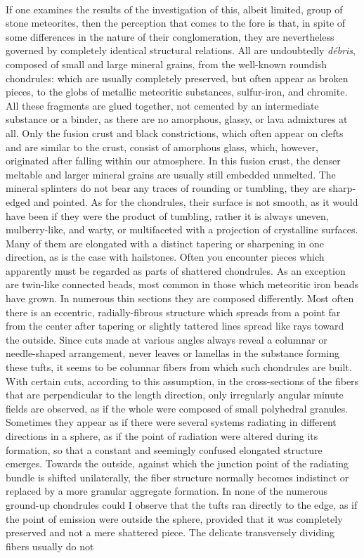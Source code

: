 \documentclass[a4paper, 12pt, oneside]{article}
\begin{document}
\paragraph*{}
If one examines the results of the investigation of this, albeit limited, group of stone meteorites, then the perception that comes to the fore is that, in spite of some differences in the nature of their conglomeration, they are nevertheless governed by completely identical structural relations. All are undoubtedly \emph{débris}, composed of small and large mineral grains, from the well-known roundish chondrules: which are usually completely preserved, but often appear as broken pieces, to the globs of metallic meteoritic substances, sulfur-iron, and chromite. All these fragments are glued together, not cemented by an intermediate substance or a binder, as there are no amorphous, glassy, or lava admixtures at all. Only the fusion crust and black constrictions, which often appear on clefts and are similar to the crust, consist of amorphous glass, which, however, originated after falling within our atmosphere. In this fusion crust, the denser meltable and larger mineral grains are usually still embedded unmelted. The mineral splinters do not bear any traces of rounding or tumbling, they are sharp-edged and pointed. As for the chondrules, their surface is not smooth, as it would have been if they were the product of tumbling, rather it is always uneven, mulberry-like, and warty, or multifaceted with a projection of crystalline surfaces. Many of them are elongated with a distinct tapering or sharpening in one direction, as is the case with hailstones. Often you encounter pieces which apparently must be regarded as parts of shattered chondrules. As an exception are twin-like connected beads, most common in those which meteoritic iron beads have grown. In numerous thin sections they are composed differently. Most often there is an eccentric, radially-fibrous structure which spreads from a point far from the center after tapering or slightly tattered lines spread like rays toward the outside. Since cuts made at various angles always reveal a columnar or needle-shaped arrangement, never leaves or lamellas in the substance forming these tufts, it seems to be columnar fibers from which such chondrules are built. With certain cuts, according to this assumption, in the cross-sections of the fibers that are perpendicular to the length direction, only irregularly angular minute fields are observed, as if the whole were composed of small polyhedral granules. Sometimes they appear as if there were several systems radiating in different directions in a sphere, as if the point of radiation were altered during its formation, so that a constant and seemingly confused elongated structure emerges. Towards the outside, against which the junction point of the radiating bundle is shifted unilaterally, the fiber structure normally becomes indistinct or replaced by a more granular aggregate formation. In none of the numerous ground-up chondrules could I observe that the tufts ran directly to the edge, as if the point of emission were outside the sphere, provided that it was completely preserved and not a mere shattered piece. The delicate transversely dividing fibers usually do not 
\end{document}
